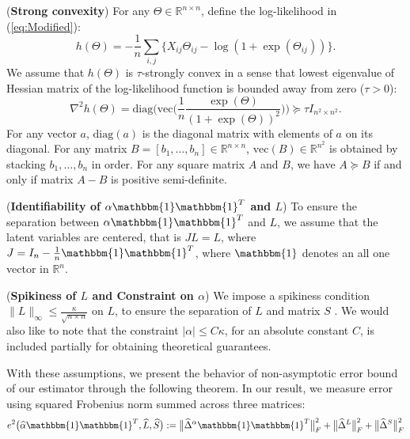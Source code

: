 \documentclass[AMS,STIX1COL]{WileyNJD-v2}
\begin{document}
{\begin{assumption}(\textbf{Strong convexity})  \label{Ass:1}
For any $\Theta \in \mathbb{R}^{n\times n}$, define the log-likelihood in (\ref{eq:Modified}):
$$
h(\Theta) = -\frac{1}{n}\sum_{i,j} \big\{ X_{ij}\Theta_{ij} - \log(1+\exp(\Theta_{ij})) \big\}.
$$
We assume that $h(\Theta)$ is $\tau$-strongly convex in a sense that lowest eigenvalue of Hessian matrix of the log-likelihood function is bounded away from zero ($\tau > 0$):
\[
\nabla^{2}h(\Theta) = \mbox{diag}\Big(\mbox{vec}\Big(\frac{1}{n}\frac{\exp(\Theta)}{(1+\exp(\Theta))^{2}}
\Big)\Big) \succcurlyeq \tau I_{n^{2} \times n^{2}}. 
\]
For any vector $a$, $\mbox{diag}(a)$ is the diagonal matrix with elements of $a$ on its diagonal.
For any matrix $B=[b_1,\dots,b_n]\in\mathbb{R}^{n \times n}$, $\mbox{vec}(B)\in\mathbb{R}^{n^2}$ is obtained by stacking $ b_1,\dots, b_{n}$ in order.
For any square matrix $A$ and $B$, we have $ A \succcurlyeq B $ if and only if matrix $A-B$ is positive semi-definite.
\end{assumption}

\begin{assumption} (\textbf{Identifiability of $\alpha\mathbbm{1}\mathbbm{1}^T$ and $L$}) \label{Ass:2}
To ensure the separation between $\alpha\mathbbm{1}\mathbbm{1}^T$ and $L$, we assume that the latent variables are centered, that is $JL=L$, where $J=I_{n}-\frac{1}{n}\mathbbm{1}\mathbbm{1}^T$, where $\mathbbm{1}$ denotes an all one vector in $\mathbb{R}^{n}$.
\end{assumption}

\begin{assumption} (\textbf{Spikiness of $L$ and Constraint on $\alpha$}) \label{Ass:3}
We impose a spikiness condition $\|L\|_{\infty}\leq\frac{\kappa}{\sqrt{n \times n}}$ on $L$, to ensure the separation of $L$ and matrix $S$ \cite{agarwal2012noisy}. 
We would also like to note that the constraint $|\alpha|\leq C\kappa$, for an absolute constant $C$, is included partially for obtaining theoretical guarantees.
\end{assumption}

With these assumptions, we present the behavior of non-asymptotic error bound of our estimator through the following theorem. In our result, we measure error using squared Frobenius norm summed across three matrices:
\[
    e^{2}\big(\widehat{\alpha}\mathbbm{1}\mathbbm{1}^T,\widehat{L},\widehat{S}\big)
    :=\big\|\widehat{\Delta}^{\alpha}\mathbbm{1}\mathbbm{1}^T\big\|_{F}^{2} + \big\|\widehat{\Delta}^{L}\big\|_{F}^{2} + \big\|\widehat{\Delta}^{S}\big\|_{F}^{2}
\]

}
\end{document}
